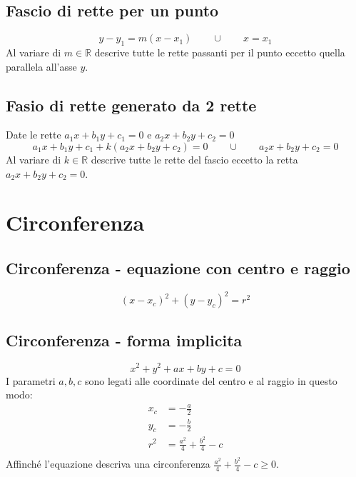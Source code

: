 \documentclass{article}
\begin{document}
  \subsection*{Fascio di rette per un punto}
  \begin{equation}
    y-y_1 = m(x-x_1) \qquad\cup\qquad x = x_1
  \end{equation}
  Al variare di $m \in \mathbb{R}$ descrive tutte le rette passanti per il punto eccetto quella parallela all'asse $y$.

  \subsection*{Fasio di rette generato da 2 rette}
  Date le rette $a_1x+b_1y+c_1 = 0$ e $a_2x+b_2y+c_2 = 0$
  \begin{equation}
    a_1x+b_1y+c_1 + k (a_2x+b_2y+c_2) = 0 \qquad\cup\qquad a_2x+b_2y+c_2 = 0
  \end{equation}
  Al variare di $k \in \mathbb{R}$ descrive tutte le rette del fascio eccetto la retta $a_2x+b_2y+c_2 = 0$.

  \newpage
  \section{Circonferenza}
  \subsection*{Circonferenza - equazione con centro e raggio}
  \begin{equation}
    (x-x_c)^2+(y-y_c)^2 = r^2
  \end{equation}

  \subsection*{Circonferenza - forma implicita}
  \begin{equation}
    x^2+y^2+ax+by+c = 0
  \end{equation}
  I parametri $a, b, c$ sono legati alle coordinate del centro e al raggio in questo modo: 
  \begin{align*}
    x_c &= -\frac{a}{2}\\
    y_c &= -\frac{b}{2}\\
    r^2 &= \frac{a^2}{4} + \frac{b^2}{4} - c \\
  \end{align*}
  Affinché l'equazione descriva una circonferenza $\frac{a^2}{4} + \frac{b^2}{4} - c \ge 0$.
\end{document}
